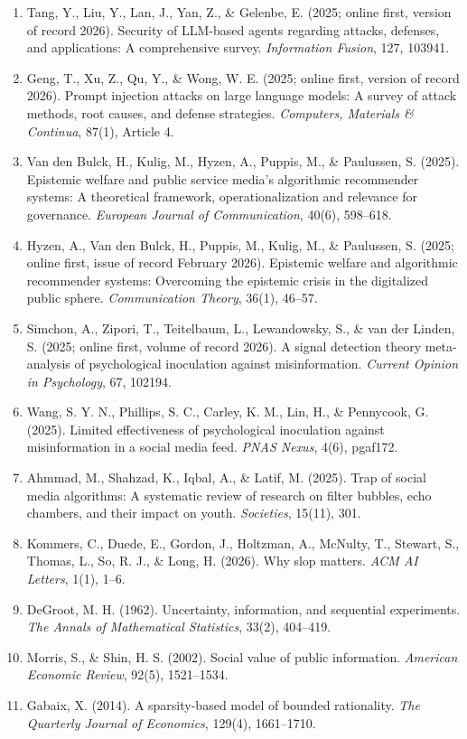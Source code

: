 \documentclass[
  11pt]{article}
\begin{document}
\begin{enumerate}
  Wang, J., Jin, S., Zhou, E., Zheng, R., Fan, X., Wang, X., Xiong, L.,
  Zhou, Y., Wang, W., Jiang, C., Zou, Y., Liu, X., Yin, Z., Dou, S.,
  Weng, R., Qin, W., Zheng, Y., Qiu, X., Huang, X., Zhang, Q., \& Gui,
  T. (2025). The rise and potential of large language model based
  agents: A survey. \emph{Science China Information Sciences}, 68(2),
  121101.
\item
  Tang, Y., Liu, Y., Lan, J., Yan, Z., \& Gelenbe, E. (2025; online
  first, version of record 2026). Security of LLM-based agents regarding
  attacks, defenses, and applications: A comprehensive survey.
  \emph{Information Fusion}, 127, 103941.
\item
  Geng, T., Xu, Z., Qu, Y., \& Wong, W. E. (2025; online first, version
  of record 2026). Prompt injection attacks on large language models: A
  survey of attack methods, root causes, and defense strategies.
  \emph{Computers, Materials \& Continua}, 87(1), Article 4.
\item
  Van den Bulck, H., Kulig, M., Hyzen, A., Puppis, M., \& Paulussen, S.
  (2025). Epistemic welfare and public service media's algorithmic
  recommender systems: A theoretical framework, operationalization and
  relevance for governance. \emph{European Journal of Communication},
  40(6), 598--618.
\item
  Hyzen, A., Van den Bulck, H., Puppis, M., Kulig, M., \& Paulussen, S.
  (2025; online first, issue of record February 2026). Epistemic welfare
  and algorithmic recommender systems: Overcoming the epistemic crisis
  in the digitalized public sphere. \emph{Communication Theory}, 36(1),
  46--57.
\item
  Simchon, A., Zipori, T., Teitelbaum, L., Lewandowsky, S., \& van der
  Linden, S. (2025; online first, volume of record 2026). A signal
  detection theory meta-analysis of psychological inoculation against
  misinformation. \emph{Current Opinion in Psychology}, 67, 102194.
\item
  Wang, S. Y. N., Phillips, S. C., Carley, K. M., Lin, H., \& Pennycook,
  G. (2025). Limited effectiveness of psychological inoculation against
  misinformation in a social media feed. \emph{PNAS Nexus}, 4(6),
  pgaf172.
\item
  Ahmmad, M., Shahzad, K., Iqbal, A., \& Latif, M. (2025). Trap of
  social media algorithms: A systematic review of research on filter
  bubbles, echo chambers, and their impact on youth. \emph{Societies},
  15(11), 301.
\item
  Kommers, C., Duede, E., Gordon, J., Holtzman, A., McNulty, T.,
  Stewart, S., Thomas, L., So, R. J., \& Long, H. (2026). Why slop
  matters. \emph{ACM AI Letters}, 1(1), 1--6.
\item
  DeGroot, M. H. (1962). Uncertainty, information, and sequential
  experiments. \emph{The Annals of Mathematical Statistics}, 33(2),
  404--419.
\item
  Morris, S., \& Shin, H. S. (2002). Social value of public information.
  \emph{American Economic Review}, 92(5), 1521--1534.
\item
  Gabaix, X. (2014). A sparsity-based model of bounded rationality.
  \emph{The Quarterly Journal of Economics}, 129(4), 1661--1710.
\end{enumerate}
\end{document}
